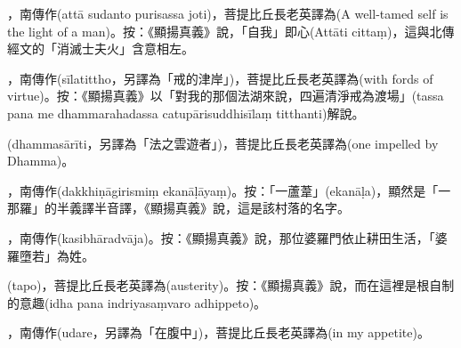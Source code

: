 \startitemgroup[noteitems]
\item{}，南傳作(attā sudanto purisassa joti)，菩提比丘長老英譯為(A well-tamed self is the light of a man)。按：《顯揚真義》說，「自我」即心(Attāti cittaṃ)，這與北傳經文的「消滅士夫火」含意相左。
\stopitemgroup

\startitemgroup[noteitems]
\item{}，南傳作(sīlatittho，另譯為「戒的津岸」)，菩提比丘長老英譯為(with fords of virtue)。按：《顯揚真義》以「對我的那個法湖來說，四遍清淨戒為渡場」(tassa pana me dhammarahadassa catupārisuddhisīlaṃ titthanti)解說。
\stopitemgroup

\startitemgroup[noteitems]
\item{}(dhammasārīti，另譯為「法之雲遊者」)，菩提比丘長老英譯為(one impelled by Dhamma)。
\stopitemgroup

\startitemgroup[noteitems]
\item{}，南傳作(dakkhiṇāgirismiṃ ekanāḷāyaṃ)。按：「一蘆葦」(ekanāḷa)，顯然是「一那羅」的半義譯半音譯，《顯揚真義》說，這是該村落的名字。
\stopitemgroup

\startitemgroup[noteitems]
\item{}，南傳作(kasibhāradvāja)。按：《顯揚真義》說，那位婆羅門依止耕田生活，「婆羅墮若」為姓。
\stopitemgroup

\startitemgroup[noteitems]
\item{}(tapo)，菩提比丘長老英譯為(austerity)。按：《顯揚真義》說，而在這裡是根自制的意趣(idha pana indriyasaṃvaro adhippeto)。
\stopitemgroup

\startitemgroup[noteitems]
\item{}，南傳作(udare，另譯為「在腹中」)，菩提比丘長老英譯為(in my appetite)。
\stopitemgroup

